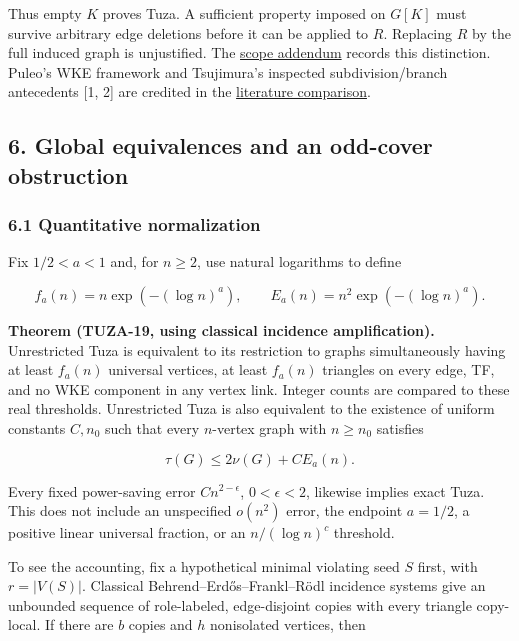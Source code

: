 \documentclass[11pt,a4paper]{article}
\begin{document}
Thus empty \(K\) proves Tuza. A sufficient property imposed on \(G[K]\) must survive arbitrary edge deletions before it can be applied to \(R\). Replacing \(R\) by the full induced graph is unjustified. The \href{https://github.com/pappa211/ai-math-experiments/blob/main/problems/TUZA-19/notes/four_branch_wke_scope_addendum.md}{scope addendum} records this distinction. Puleo's WKE framework and Tsujimura's inspected subdivision/branch antecedents {[}1, 2{]} are credited in the \href{https://github.com/pappa211/ai-math-experiments/blob/main/papers/tuza-16-19-research-summary/LITERATURE_RECHECK.md}{literature comparison}.

\subsection{6. Global equivalences and an odd-cover obstruction}\label{global-equivalences-and-an-odd-cover-obstruction}

\subsubsection{6.1 Quantitative normalization}\label{quantitative-normalization}

Fix \(1/2<a<1\) and, for \(n\ge2\), use natural logarithms to define

\[f_a(n)=n\exp(-(\log n)^a),\qquad E_a(n)=n^2\exp(-(\log n)^a).\]

\textbf{Theorem (TUZA-19, using classical incidence amplification).} Unrestricted Tuza is equivalent to its restriction to graphs simultaneously having at least \(f_a(n)\) universal vertices, at least \(f_a(n)\) triangles on every edge, TF, and no WKE component in any vertex link. Integer counts are compared to these real thresholds. Unrestricted Tuza is also equivalent to the existence of uniform constants \(C,n_0\) such that every \(n\)-vertex graph with \(n\ge n_0\) satisfies

\[\tau(G)\le2\nu(G)+C E_a(n).\]

Every fixed power-saving error \(C n^{2-\epsilon}\), \(0<\epsilon<2\), likewise implies exact Tuza. This does not include an unspecified \(o(n^2)\) error, the endpoint \(a=1/2\), a positive linear universal fraction, or an \(n/(\log n)^c\) threshold.

To see the accounting, fix a hypothetical minimal violating seed \(S\) first, with \(r=|V(S)|\). Classical Behrend--Erd\H{o}s--Frankl--Rödl incidence systems give an unbounded sequence of role-labeled, edge-disjoint copies with every triangle copy-local. If there are \(b\) copies and \(h\) nonisolated vertices, then
\end{document}
